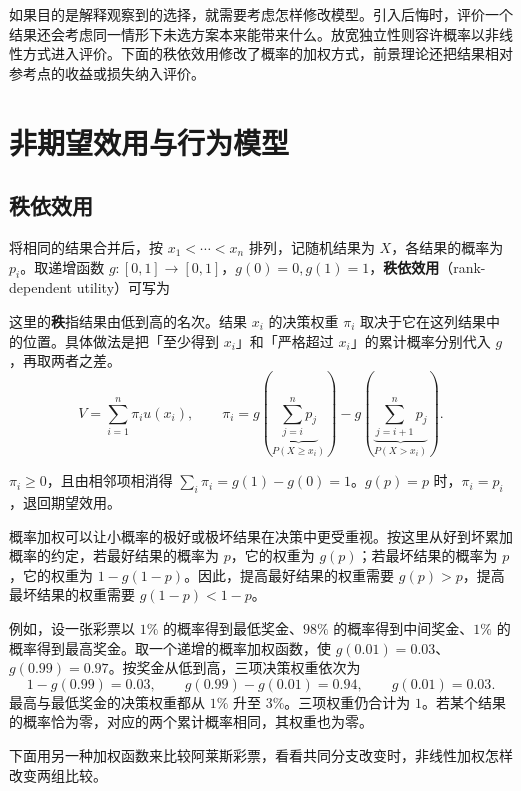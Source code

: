 如果目的是解释观察到的选择，就需要考虑怎样修改模型。引入后悔时，评价一个结果还会考虑同一情形下未选方案本来能带来什么。放宽独立性则容许概率以非线性方式进入评价。下面的秩依效用修改了概率的加权方式，前景理论还把结果相对参考点的收益或损失纳入评价。

\section{非期望效用与行为模型}\label{sec:wj-six-behavior}
\subsection{秩依效用}
将相同的结果合并后，按 $x_1<\cdots<x_n$ 排列，记随机结果为 $X$，各结果的概率为 $p_i$。取递增函数 $g:[0,1]\to[0,1]$，$g(0)=0,g(1)=1$，\textbf{秩依效用}（rank-dependent utility）可写为
\begin{tcolorbox}[knowledge,title=秩依效用与累计概率权重]
这里的\textbf{秩}指结果由低到高的名次。结果 $x_i$ 的决策权重 $\pi_i$ 取决于它在这列结果中的位置。具体做法是把「至少得到 $x_i$」和「严格超过 $x_i$」的累计概率分别代入 $g$，再取两者之差。
\[
 V=\sum_{i=1}^n\pi_i u(x_i),\qquad
 \pi_i=g\!\left(\underbrace{\sum_{j=i}^np_j}_{P(X\ge x_i)}\right)
       -g\!\left(\underbrace{\sum_{j=i+1}^np_j}_{P(X>x_i)}\right).
\]

$\pi_i\ge0$，且由相邻项相消得 $\sum_i\pi_i=g(1)-g(0)=1$。$g(p)=p$ 时，$\pi_i=p_i$，退回期望效用。
\end{tcolorbox}
概率加权可以让小概率的极好或极坏结果在决策中更受重视。按这里从好到坏累加概率的约定，若最好结果的概率为 $p$，它的权重为 $g(p)$；若最坏结果的概率为 $p$，它的权重为 $1-g(1-p)$。因此，提高最好结果的权重需要 $g(p)>p$，提高最坏结果的权重需要 $g(1-p)<1-p$。

例如，设一张彩票以 $1\%$ 的概率得到最低奖金、$98\%$ 的概率得到中间奖金、$1\%$ 的概率得到最高奖金。取一个递增的概率加权函数，使 $g(0.01)=0.03$、$g(0.99)=0.97$。按奖金从低到高，三项决策权重依次为
\[
 1-g(0.99)=0.03,\qquad
 g(0.99)-g(0.01)=0.94,\qquad
 g(0.01)=0.03.
\]
最高与最低奖金的决策权重都从 $1\%$ 升至 $3\%$。三项权重仍合计为 $1$。若某个结果的概率恰为零，对应的两个累计概率相同，其权重也为零。

下面用另一种加权函数来比较阿莱斯彩票，看看共同分支改变时，非线性加权怎样改变两组比较。

